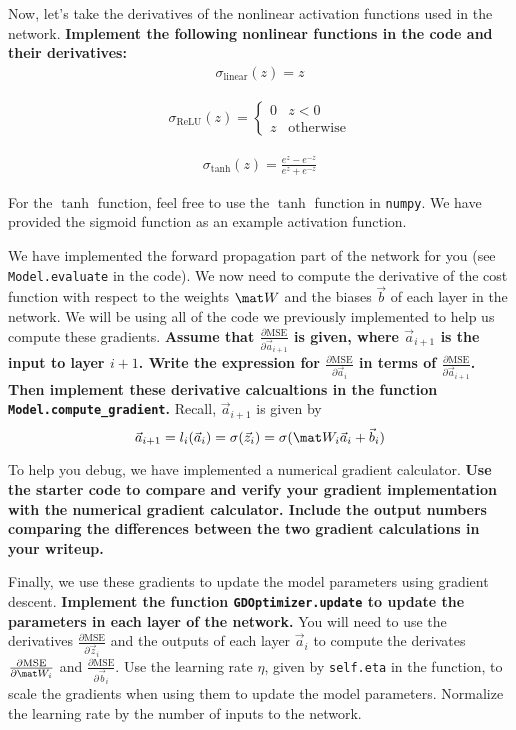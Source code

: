 \documentclass[preview]{standalone}
\begin{document}
\begin{Parts}
\Part Now, let's take the derivatives of the nonlinear activation functions used in the network.  \textbf{Implement the following nonlinear functions in the code and their derivatives:}
\begin{align*}
\sigma_{\text{linear}}(z)=z
\end{align*}

\begin{align*}
\sigma_{\text{ReLU}}(z)=\begin{cases}0 & z<0 \\ z & \text{otherwise}\end{cases}
\end{align*}

\begin{align*}
\sigma_{\text{tanh}}(z)=\frac{e^z-e^{-z}}{e^z+e^{-z}}
\end{align*}

For the $\tanh$ function, feel free to use the $\tanh$ function in \texttt{numpy}.  We have provided the sigmoid function as an example activation function.





\Part We have implemented the forward propagation part of the network for you (see \texttt{Model.evaluate} in the code). We now need to compute the derivative of the cost function with respect to the weights $\mat W$ and the biases $\vec{b}$ of each layer in the network.  We will be using all of the code we previously implemented to help us compute these gradients.  \textbf{Assume that $\frac{\partial\text{MSE}}{\partial\vec{a}_{i+1}}$ is given, where $\vec{a}_{i+1}$ is the input to layer $i+1$.  Write the expression for $\frac{\partial\text{MSE}}{\partial \vec{a}_i}$ in terms of $\frac{\partial\text{MSE}}{\partial\vec{a}_{i+1}}$.  Then implement these derivative calcualtions in the function \texttt{Model.compute\_gradient}.}  Recall, $\vec{a}_{i+1}$ is given by
$$\vec a_{i+1} = l_i(\vec a_i) = \sigma(\vec z_i) = \sigma(\mat W_i\vec a_i+\vec{b}_i)$$



\Part To help you debug, we have implemented a numerical gradient calculator. \textbf{Use the starter code to compare and verify your gradient implementation with the numerical gradient calculator. Include the output numbers comparing the differences between the two gradient calculations in your writeup.}



\Part Finally, we use these gradients to update the model parameters using gradient descent.  \textbf{Implement the function \texttt{GDOptimizer.update} to update the parameters in each layer of the network.}  You will need to use the derivatives $\frac{\partial\text{MSE}}{\partial \vec{z}_i}$ and the outputs of each layer $\vec{a}_i$ to compute the derivates $\frac{\partial\text{MSE}}{\partial \mat W_i}$ and $\frac{\partial\text{MSE}}{\partial \vec{b}_i}$.  Use the learning rate $\eta$, given by \texttt{self.eta} in the function, to scale the gradients when using them to update the model parameters. Normalize the learning rate by the number of inputs to the network.




\end{Parts}
\end{document}
